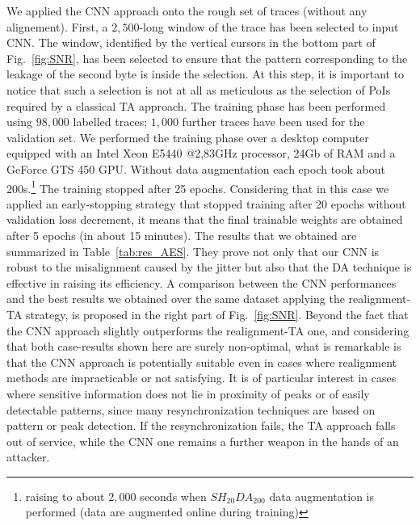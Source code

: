 We applied the CNN approach onto the rough set of traces (without any alignement). First, a $2,500$-long window of the trace has been selected to input CNN. The window, identified by the vertical cursors in the bottom part of Fig.~\ref{fig:SNR}, has been selected to ensure that the pattern corresponding to the leakage of the second byte is inside the selection. At this step, it is important to notice that such a selection is not at all  as meticulous as the selection of PoIs required by a classical TA approach. The training phase has been performed using $98,000$ labelled traces; $1,000$ further traces have been used for the validation set. We performed the training phase over a desktop computer equipped with an Intel Xeon E5440 @2,83GHz processor, 24Gb of RAM and a GeForce GTS 450 GPU. Without data augmentation each epoch took about 200s.\footnote{raising to about $2,000$ seconds when $SH_{20}DA_{200}$ data augmentation is performed (data are augmented online during training)} The training stopped after 25 epochs. Considering that in this case we applied an early-stopping strategy that stopped training after 20 epochs without validation loss decrement, it means that the final trainable weights are obtained after 5 epochs (in about 15 minutes). The results that we obtained are summarized in Table~\ref{tab:res_AES}. They prove not only that our CNN is robust to the misalignment caused by the jitter but also that the DA technique is effective in raising its efficiency. A comparison between the CNN performances and the best results we obtained over the same dataset applying the realignment-TA strategy, is proposed in the right part of Fig.~\ref{fig:SNR}. Beyond the fact that the CNN approach slightly outperforms the realignment-TA one, and considering that both case-results shown here are surely non-optimal, what is remarkable is that the CNN approach is potentially suitable even in cases where realignment methods are impracticable or not satisfying. It is of particular interest in cases where sensitive information does not lie in proximity of peaks or of easily detectable patterns, since many resynchronization techniques are based on pattern or peak detection. If the resynchronization fails, the TA approach falls out of service, while the CNN one remains a further weapon in the hands of an attacker.


